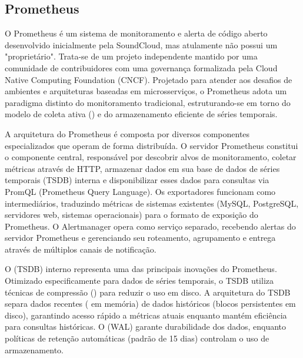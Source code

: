 \subsection{Prometheus}
\label{subsection:Prometheus}

{\color{red}

O Prometheus \citep{prometheus2025} é um sistema de monitoramento e alerta de código aberto desenvolvido inicialmente pela SoundCloud, mas atulamente não possui um "proprietário". Trata-se de um projeto independente mantido por uma comunidade de contribuidores com uma governança formalizada pela Cloud Native Computing Foundation (CNCF). Projetado para atender aos desafios de ambientes  e arquiteturas baseadas em microsserviços, o Prometheus adota um paradigma distinto do monitoramento tradicional, estruturando-se em torno do modelo de coleta ativa () e do armazenamento eficiente de séries temporais.

A arquitetura do Prometheus é composta por diversos componentes especializados que operam de forma distribuída. O servidor Prometheus constitui o componente central, responsável por descobrir alvos de monitoramento, coletar métricas através de  HTTP, armazenar dados em sua base de dados de séries temporais (TSDB) interna e disponibilizar esses dados para consultas via PromQL (Prometheus Query Language). Os exportadores funcionam como intermediários, traduzindo métricas de sistemas existentes (MySQL, PostgreSQL, servidores web, sistemas operacionais) para o formato de exposição do Prometheus. O Alertmanager opera como serviço separado, recebendo alertas do servidor Prometheus e gerenciando seu roteamento, agrupamento e entrega através de múltiplos canais de notificação.

O  (TSDB) interno representa uma das principais inovações do Prometheus. Otimizado especificamente para dados de séries temporais, o TSDB utiliza técnicas de compressão () para reduzir o uso em disco. A arquitetura do TSDB separa dados recentes ( em memória) de dados históricos (blocos persistentes em disco), garantindo acesso rápido a métricas atuais enquanto mantém eficiência para consultas históricas. O  (WAL) garante durabilidade dos dados, enquanto políticas de retenção automáticas (padrão de 15 dias) controlam o uso de armazenamento.

}
